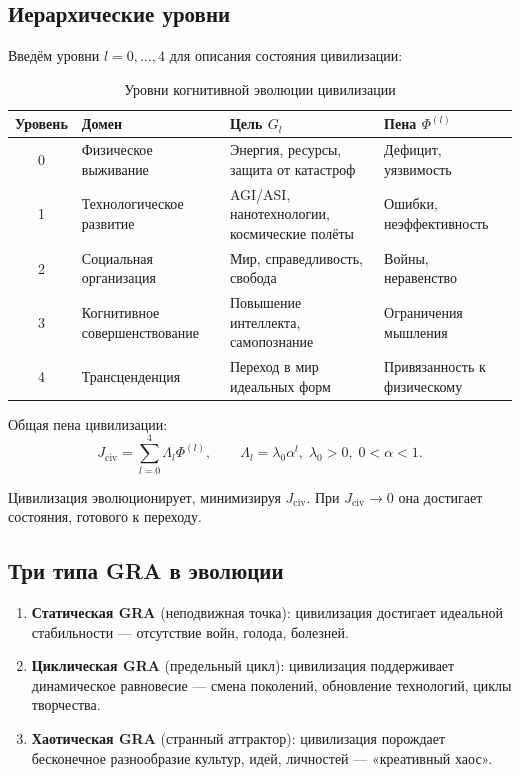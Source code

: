 \documentclass[12pt,a4paper]{article}
\begin{document}
\subsection{Иерархические уровни}

Введём уровни \(l = 0,\dots,4\) для описания состояния цивилизации:

\begin{table}[h]
\centering
\caption{Уровни когнитивной эволюции цивилизации}
\label{tab:levels}
\begin{tabular}{|c|l|l|p{6cm}|}
\hline
Уровень & Домен & Цель \(G_l\) & Пена \(\Phi^{(l)}\) \\
\hline
0 & Физическое выживание & Энергия, ресурсы, защита от катастроф & Дефицит, уязвимость \\
1 & Технологическое развитие & AGI/ASI, нанотехнологии, космические полёты & Ошибки, неэффективность \\
2 & Социальная организация & Мир, справедливость, свобода & Войны, неравенство \\
3 & Когнитивное совершенствование & Повышение интеллекта, самопознание & Ограничения мышления \\
4 & Трансценденция & Переход в мир идеальных форм & Привязанность к физическому \\
\hline
\end{tabular}
\end{table}

Общая пена цивилизации:
\[
J_{\text{civ}} = \sum_{l=0}^{4} \Lambda_l \Phi^{(l)}, \qquad \Lambda_l = \lambda_0 \alpha^l,\; \lambda_0>0,\;0<\alpha<1.
\]

Цивилизация эволюционирует, минимизируя \(J_{\text{civ}}\). При \(J_{\text{civ}} \to 0\) она достигает состояния, готового к переходу.

\subsection{Три типа GRA в эволюции}

\begin{enumerate}
    \item \textbf{Статическая GRA} (неподвижная точка): цивилизация достигает идеальной стабильности — отсутствие войн, голода, болезней.
    \item \textbf{Циклическая GRA} (предельный цикл): цивилизация поддерживает динамическое равновесие — смена поколений, обновление технологий, циклы творчества.
    \item \textbf{Хаотическая GRA} (странный аттрактор): цивилизация порождает бесконечное разнообразие культур, идей, личностей — «креативный хаос».
\end{enumerate}
\end{document}
